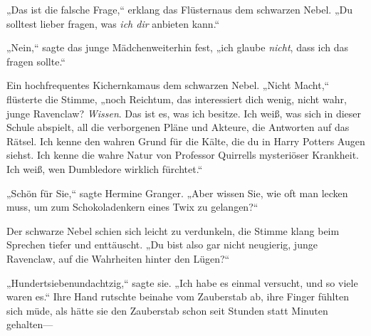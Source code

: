 „Das ist die falsche Frage,“ erklang das Flüsternaus dem schwarzen Nebel. „Du solltest lieber fragen, was \emph{ich dir} anbieten kann.“

„Nein,“ sagte das junge Mädchenweiterhin fest, „ich glaube \emph{nicht}, dass ich das fragen sollte.“

Ein hochfrequentes Kichernkamaus dem schwarzen Nebel. „Nicht Macht,“ flüsterte die Stimme, „noch Reichtum, das interessiert dich wenig, nicht wahr, junge Ravenclaw? \emph{Wissen}. Das ist es, was ich besitze. Ich weiß, was sich in dieser Schule abspielt, all die verborgenen Pläne und Akteure, die Antworten auf das Rätsel. Ich kenne den wahren Grund für die Kälte, die du in Harry Potters Augen siehst. Ich kenne die wahre Natur von Professor Quirrells mysteriöser Krankheit. Ich weiß, wen Dumbledore wirklich fürchtet.“

„Schön für Sie,“ sagte Hermine Granger. „Aber wissen Sie, wie oft man lecken muss, um zum Schokoladenkern eines Twix zu gelangen?“

Der schwarze Nebel schien sich leicht zu verdunkeln, die Stimme klang beim Sprechen tiefer und enttäuscht. „Du bist also gar nicht neugierig, junge Ravenclaw, auf die Wahrheiten hinter den Lügen?“

„Hundertsiebenundachtzig,“ sagte sie. „Ich habe es einmal versucht, und so viele waren es.“ Ihre Hand rutschte beinahe vom Zauberstab ab, ihre Finger fühlten sich müde, als hätte sie den Zauberstab schon seit Stunden statt Minuten gehalten—

